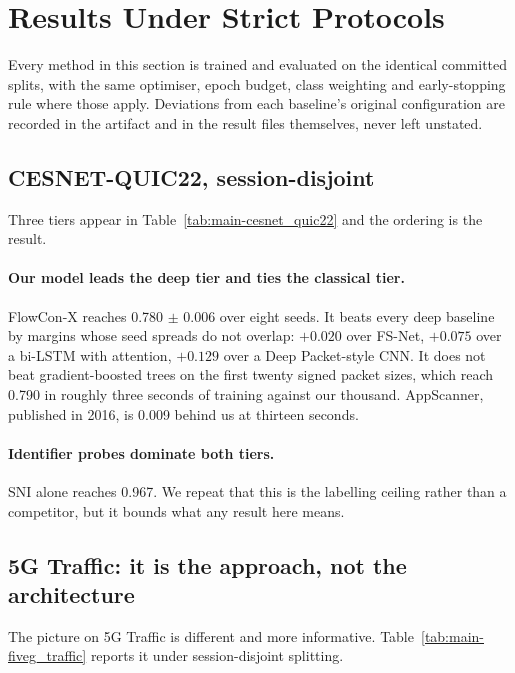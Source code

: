 \section{Results Under Strict Protocols}
\label{sec:results}

Every method in this section is trained and evaluated on the identical
committed splits, with the same optimiser, epoch budget, class weighting and
early-stopping rule where those apply. Deviations from each baseline's original
configuration are recorded in the artifact and in the result files themselves,
never left unstated.



\subsection{CESNET-QUIC22, session-disjoint}

Three tiers appear in Table~\ref{tab:main-cesnet_quic22} and the ordering is
the result.

\paragraph{Our model leads the deep tier and ties the classical tier.} FlowCon-X
reaches 0.780 $\pm$ 0.006 over eight seeds. It beats every deep baseline by
margins whose seed spreads do not overlap: $+0.020$ over FS-Net, $+0.075$ over
a bi-LSTM with attention, $+0.129$ over a Deep Packet-style CNN. It does not
beat gradient-boosted trees on the first twenty signed packet sizes, which
reach 0.790 in roughly three seconds of training against our thousand.
AppScanner, published in 2016, is 0.009 behind us at thirteen seconds.

\paragraph{Identifier probes dominate both tiers.} SNI alone reaches 0.967. We
repeat that this is the labelling ceiling rather than a competitor, but it
bounds what any result here means.

\subsection{5G Traffic: it is the approach, not the architecture}

The picture on 5G Traffic is different and more informative.
Table~\ref{tab:main-fiveg_traffic} reports it under session-disjoint splitting.

